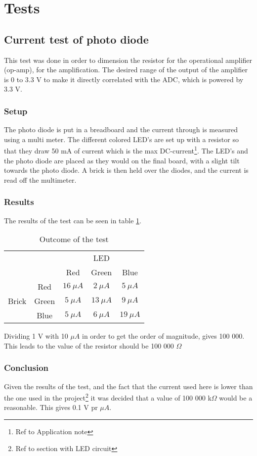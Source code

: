 \section{Tests}

\subsection{Current test of photo diode}
This test was done in order to dimension the resistor for the operational amplifier (op-amp), for the amplification.
The desired range of the output of the amplifier is 0 to 3.3 V to make it directly correlated with the ADC, which is powered by 3.3 V. 
\subsubsection{Setup}
The photo diode is put in a breadboard and the current through is measured using a multi meter. The different colored LED's are set up with a resistor so that they draw 50 mA of current which is the max DC-current\footnote{Ref to Application note}. The LED's and the photo diode are placed as they would on the final board, with a slight tilt towards the photo diode. A brick is then held over the diodes, and the current is read off the multimeter.

\subsubsection{Results}
The results of the test can be seen in table \ref{tab::test_pd}.
\begin{table}[H]
\centering
 \begin{tabular}{|ccccc|}
 \hline
  & & \multicolumn{3}{c}{LED} \vline \\ 
  & & Red & Green & Blue \\
  \multirow{3}{*}{Brick}& Red & $16\ \mu A$ & $2\ \mu A$ & $5\ \mu A$ \\ 
  & Green & $5\ \mu A$ & $13\ \mu A$ & $9\ \mu A$ \\
  & Blue & $5\ \mu A$ & $6\ \mu A$ & $19\ \mu A$ \\
  \hline
 \end{tabular}
\caption{Outcome of the test}
\label{tab::test_pd}
\end{table}

Dividing 1 V with 10 $\mu A$ in order to get the order of magnitude, gives 100 000. This leads to the value of the resistor should be 100 000 $\Omega$ 
\subsubsection{Conclusion}
Given the results of the test, and the fact that the current used here is lower than the one used in the project\footnote{Ref to section with LED circuit} it was decided that a value of 100 000 k$\Omega$ would be a reasonable. This gives 0.1 V pr $\mu A$.
